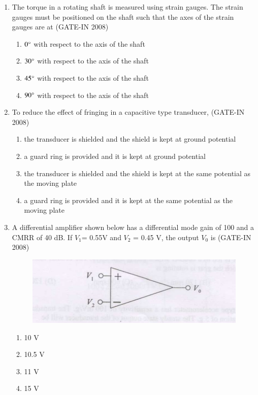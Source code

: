\documentclass[journal,12pt,onecolumn]{IEEEtran}
\theoremstyle{remark}
\begin{document}
\begin{enumerate}
    \item The torque in a rotating shaft is measured using strain gauges. The strain gauges must be positioned
on the shaft such that the axes of the strain gauges are at \hfill{(GATE-IN 2008)}
\begin{multicols}{2}
    \begin{enumerate} 
        \item  $0\degree$ with respect to the axis of the shaft 
        \item  $30\degree$ with respect to the axis of the shaft
        \item  $45\degree$ with respect to the axis of the shaft
        \item  $90\degree$ with respect to the axis of the shaft
    \end{enumerate}
    \end{multicols}
    
    \item To reduce the effect of fringing in a capacitive type transducer, \hfill{(GATE-IN 2008)}
    \begin{enumerate} 
        \item  the transducer is shielded and the shield is kept at ground potential  
        \item  a guard ring is provided and it is kept at ground potential  
        \item   the transducer is shielded and the shield is kept at the same potential as the moving plate
        \item a guard ring is provided and it is kept at the same potential as the moving plate
    \end{enumerate}

    \item A differential amplifier shown below  has a differential mode gain of 100 and a CMRR of 40 dB. If $V_1$= 0.55V  and $V_2$ = 0.45 V, the output $V_0$ is \hfill{(GATE-IN 2008)}

 \begin{figure}[H]
    \centering
    \includegraphics[width=0.5\columnwidth]{figs/i18.jpg}
    \caption{}
    \label{fig:placeholder18}
\end{figure}

\begin{multicols}{4}     
    \begin{enumerate} 
        \item 10 V 
        \item 10.5 V
        \item 11 V
        \item 15 V
    \end{enumerate}
    \end{multicols}
    


\end{enumerate}
\end{document}
